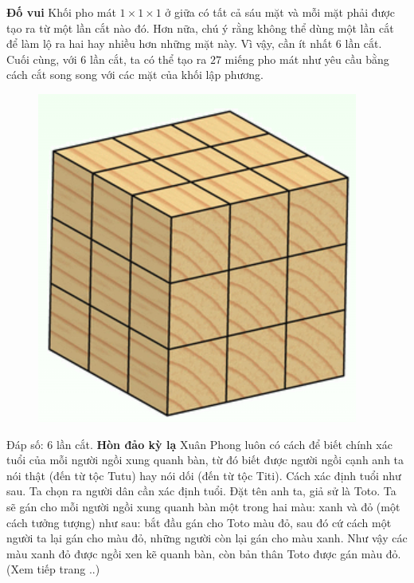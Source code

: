 \begin{multicols}{2}
	\textbf{\color{cackithi}Đố vui}
	\vskip 0.1cm
	Khối pho mát $1\times1\times1$ ở giữa có tất cả sáu mặt và mỗi mặt phải được tạo ra từ một lần cắt nào đó. Hơn nữa, chú ý rằng không thể dùng một lần cắt để làm lộ ra hai hay nhiều hơn những mặt này. Vì vậy, cần ít nhất $6$ lần cắt. Cuối cùng, với  $6$ lần cắt, ta có thể tạo ra $27$ miếng pho mát như yêu cầu bằng cách cắt song song với các mặt của khối lập phương. 
	\begin{figure}[H]
		\vspace*{-5pt}
		\centering
		\captionsetup{labelformat= empty, justification=centering}
		\includegraphics[width= 0.4\linewidth]{1}
		\vspace*{-10pt}
	\end{figure}
	Đáp số: $6$ lần cắt.
	\vskip 0.1cm
	\textbf{\color{cackithi}Hòn đảo kỳ lạ}
	\vskip 0.1cm 
	Xuân Phong luôn có cách để biết chính xác tuổi của mỗi người ngồi xung quanh bàn, từ đó biết được người ngồi cạnh anh ta nói thật (đến từ tộc Tutu) hay nói dối (đến từ tộc Titi). Cách xác định tuổi như sau.
	\vskip 0.1cm
	Ta chọn ra người dân cần xác định tuổi. Đặt tên anh ta, giả sử là Toto. Ta sẽ gán cho mỗi người ngồi xung quanh bàn một trong hai màu: xanh và đỏ (một cách tưởng tượng) như sau: bắt đầu gán cho Toto màu đỏ, sau đó cứ cách một người ta lại gán cho màu đỏ, những người còn lại gán cho màu xanh. Như vậy các màu xanh đỏ được ngồi xen kẽ quanh bàn, còn bản thân Toto được gán màu đỏ. 
	\vskip 0.1cm
	\hfill (Xem tiếp trang $..$)
\end{multicols}